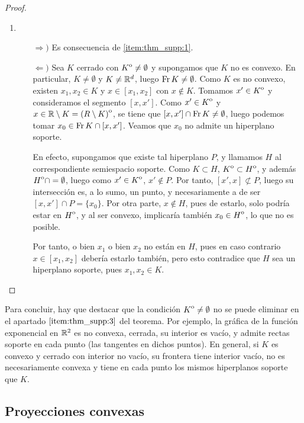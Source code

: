 \documentclass{book}
\begin{document}
\begin{proof}
\begin{enumerate}
    	\item~
    	\begin{enumerate}
    		\item[$\Rightarrow)$] Es consecuencia de \ref{item:thm_supp:1}.

    		\item[$\Leftarrow)$] Sea $K$ cerrado con ${\kern0ptK}^{\mathrm{o}} \ne \emptyset$ y supongamos que $K$ no es convexo. En particular, $K \ne \emptyset$ y $K \ne \mathbb{R}^d$, luego $\operatorname{Fr} K \ne \emptyset$. Como $K$ es no convexo, existen $x_1,x_2 \in K$ y $x \in [x_1,x_2]$ con $x \notin K$. Tomamos $x' \in {\kern0ptK}^{\mathrm{o}}$ y consideramos el segmento $[x,x']$. Como $x' \in {\kern0ptK}^{\mathrm{o}}$ y $x \in \mathbb{R}\setminus K = {\kern0pt(R\setminus K)}^{\mathrm{o}}$, se tiene que $[x,x']\cap\operatorname{Fr} K \ne \emptyset$, luego podemos tomar $x_0 \in \operatorname{Fr} K \cap [x,x']$. Veamos que $x_0$ no admite un hiperplano soporte.

    		En efecto, supongamos que existe tal hiperplano $P$, y llamamos $H$ al correspondiente semiespacio soporte. Como $K \subset H$, ${\kern0ptK}^{\mathrm{o}} \subset {\kern0ptH}^{\mathrm{o}}$, y además ${\kern0ptH}^{\mathrm{o}} \cap = \emptyset$, luego como $x' \in {\kern0ptK}^{\mathrm{o}}$, $x' \notin P$. Por tanto, $[x',x]\not\subset P$, luego su intersección es, a lo sumo, un punto, y necesariamente a de ser $[x,x']\cap P = \{x_0\}$. Por otra parte, $x\notin H$, pues de estarlo, solo podría estar en ${\kern0ptH}^{\mathrm{o}}$, y al ser convexo, implicaría también $x_0 \in {\kern0ptH}^{\mathrm{o}}$, lo que no es posible.

    		Por tanto, o bien $x_1$ o bien $x_2$ no están en $H$, pues en caso contrario $x \in [x_1,x_2]$ debería estarlo también, pero esto contradice que $H$ sea un hiperplano soporte, pues $x_1,x_2 \in K$.
    	\end{enumerate}

    \end{enumerate}
\end{proof}

Para concluir, hay que destacar que la condición ${\kern0ptK}^{\mathrm{o}} \ne \emptyset$ no se puede eliminar en el apartado $\ref{item:thm_supp:3}$ del teorema. Por ejemplo, la gráfica de la función exponencial en $\mathbb{R}^2$ es no convexa, cerrada, su interior es vacío, y admite rectas soporte en cada punto (las tangentes en dichos puntos). En general, si $K$ es convexo y cerrado con interior no vacío, su frontera tiene interior vacío, no es necesariamente convexa y tiene en cada punto los mismos hiperplanos soporte que $K$.

\subsection{Proyecciones convexas}
\end{document}
